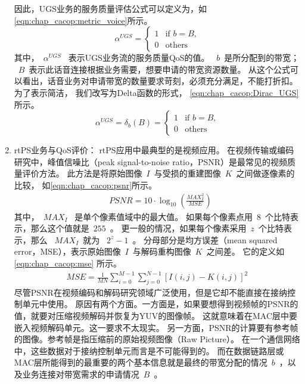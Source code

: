 \begin{enumerate}[(1)]
因此，UGS业务的服务质量评估公式可以定义为，如\eqref{eqn:chap_cacop:metric_voice}所示。
\begin{equation}
\label{eqn:chap_cacop:metric_voice}
\alpha^{UGS}=
\begin{cases}
1 & \text{if $b=B$,}\\
0 &\text{others}
\end{cases}
\end{equation}
其中，~$\alpha^{UGS}$~ 表示UGS业务流的服务质量QoS的值。
~$b$~是所分配到的带宽；
~$B$~表示此话音连接根据业务需要，想要申请的带宽资源数量。
从这个公式可以看出，话音业务对申请带宽的数量要求苛刻，必须充分满足，不能打折扣。
为了表示简洁，
我们改写为Delta函数的形式，
\eqref{eqn:chap_cacop:Dirac_UGS}所示。
%
\begin{equation}
\label{eqn:chap_cacop:Dirac_UGS}
\alpha^{UGS}= \delta_{b}(B) = 
\begin{cases}
1 & \text{if $b= B$,}\\
0 &\text{others}
\end{cases}
\end{equation}

\item rtPS业务与QoS评价： 
rtPS应用中最典型的是视频应用。
在视频传输或编码研究中，峰值信噪比（peak signal-to-noise ratio，PSNR）是最常见的视频质量评价方法。
此方法是将原始图像~$I$~与受损的重建图像~$K$~之间做逐像素的比较，
如\eqref{eqn:chap_cacop:psnr}所示。 
%
\begin{align}
\label{eqn:chap_cacop:psnr}
& PSNR = 10 \cdot \log_{10} \left( \frac{MAX_I^2}{MSE} \right)
\end{align}
其中，~$MAX_I$~ 是单个像素值域中的最大值。
如果每个像素点用~$8$~个比特表示，那么这个值就是~$255$~。
更一般的情况，如果每个像素采用~$z$~个比特表示，那么 ~$MAX_I$~就为 ~$2^z - 1$~。
分母部分是均方误差（mean squared error，MSE），表示原始图像~$I$~与解码重构图像~$K$~之间差。
它的定义如 \eqref{eqn:chap_cacop:mse} 所示。
\begin{align}
\label{eqn:chap_cacop:mse}
MSE = \frac{1}{MN} \sum_{i=0}^{M-1}\sum_{j=0}^{N-1} \left[I(i,j) - K(i,j)\right]^2 
\end{align}
尽管PSNR在视频编码和解码研究领域广泛使用，但是它却不能直接在接纳控制单元中使用。
原因有两个方面。一方面是，如果要想得到视频帧的PSNR的值，就要对压缩视频解码并恢复为YUV的图像帧。
这就意味着在MAC层中要嵌入视频解码单元。这一要求不太现实。
另一方面，PSNR的计算要有参考帧的图像。参考帧是指压缩前的原始视频图像（Raw Picture）。
在一个通信网络中，这些数据对于接纳控制单元而言是不可能得到的。
而在数据链路层或MAC层所能得到的最重要的两个基本信息就是最终的带宽分配的情况~$b$~，以及业务连接对带宽需求的申请情况~$B$~。


\end{enumerate}
